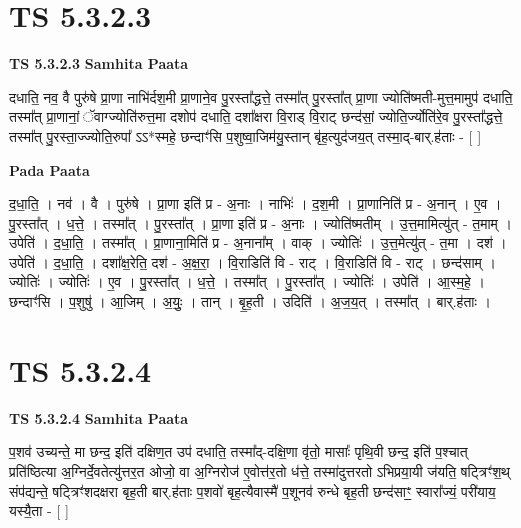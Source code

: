 \documentclass[17pt]{extarticle}
\begin{document}
\section*{ TS 5.3.2.3 }

\textbf{TS 5.3.2.3 } \newline
\textbf{Samhita Paata} \newline

दधाति॒ नव॒ वै पुरु॑षे प्रा॒णा नाभि॑र्दश॒मी प्रा॒णाने॒व पु॒रस्ता᳚द्धत्ते॒ तस्मा᳚त् पु॒रस्ता᳚त् प्रा॒णा ज्योति॑ष्मती-मुत्त॒मामुप॑ दधाति॒ तस्मा᳚त् प्रा॒णानां॒ ॅवाग्ज्योति॑रुत्त॒मा दशोप॑ दधाति॒ दशा᳚क्षरा वि॒राड् वि॒राट् छन्द॑सां॒ ज्योति॒र्ज्योति॑रे॒व पु॒रस्ता᳚द्धत्ते॒ तस्मा᳚त् पु॒रस्ता॒ज्ज्योति॒रुपा᳚ ऽऽ*स्महे॒ छन्दाꣳ॑सि प॒शुष्वा॒जिम॑यु॒स्तान् बृ॑ह॒त्युद॑जय॒त् तस्मा॒द्-बार्.ह॑ताः - [  ] \newline

\textbf{Pada Paata} \newline

द॒धा॒ति॒ । नव॑ । वै । पुरु॑षे । प्रा॒णा इति॑ प्र - अ॒नाः । नाभिः॑ । द॒श॒मी । प्रा॒णानिति॑ प्र - अ॒नान् । ए॒व । पु॒रस्ता᳚त् । ध॒त्ते॒ । तस्मा᳚त् । पु॒रस्ता᳚त् । प्रा॒णा इति॑ प्र - अ॒नाः । ज्योति॑ष्मतीम् । उ॒त्त॒मामित्यु॑त् - त॒माम् । उपेति॑ । द॒धा॒ति॒ । तस्मा᳚त् । प्रा॒णाना॒मिति॑ प्र - अ॒नाना᳚म् । वाक् । ज्योतिः॑ । उ॒त्त॒मेत्यु॑त् - त॒मा । दश॑ । उपेति॑ । द॒धा॒ति॒ । दशा᳚क्ष॒रेति॒ दश॑ - अ॒क्ष॒रा॒ । वि॒राडिति॑ वि - राट् । वि॒राडिति॑ वि - राट् । छन्द॑साम् । ज्योतिः॑ । ज्योतिः॑ । ए॒व । पु॒रस्ता᳚त् । ध॒त्ते॒ । तस्मा᳚त् । पु॒रस्ता᳚त् । ज्योतिः॑ । उपेति॑ । आ॒स्म॒हे॒ । छन्दाꣳ॑सि । प॒शुषु॑ । आ॒जिम् । अ॒युः॒ । तान् । बृ॒ह॒ती । उदिति॑ । अ॒ज॒य॒त् । तस्मा᳚त् । बार्.ह॑ताः ।  \newline




\section*{ TS 5.3.2.4 }

\textbf{TS 5.3.2.4 } \newline
\textbf{Samhita Paata} \newline

प॒शव॑ उच्यन्ते॒ मा छन्द॒ इति॑ दक्षिण॒त उप॑ दधाति॒ तस्मा᳚द्-दक्षि॒णा वृ॑तो॒ मासाः᳚ पृथि॒वी छन्द॒ इति॑ प॒श्चात् प्रति॑ष्ठित्या अ॒ग्निर्दे॒वतेत्यु॑त्तर॒त ओजो॒ वा अ॒ग्निरोज॑ ए॒वोत्त॑र॒तो ध॑त्ते॒ तस्मा॑दुत्तरतो ऽभिप्रया॒यी ज॑यति॒ षट्त्रिꣳ॑श॒थ् संप॑द्यन्ते॒ षट्त्रिꣳ॑शदक्षरा बृह॒ती बार्.ह॑ताः प॒शवो॑ बृह॒त्यैवास्मै॑ प॒शूनव॑ रुन्धे बृह॒ती छन्द॑साꣳ॒॒ स्वारा᳚ज्यं॒ परी॑याय॒ यस्यै॒ता - [  ] \newline
\end{document}
